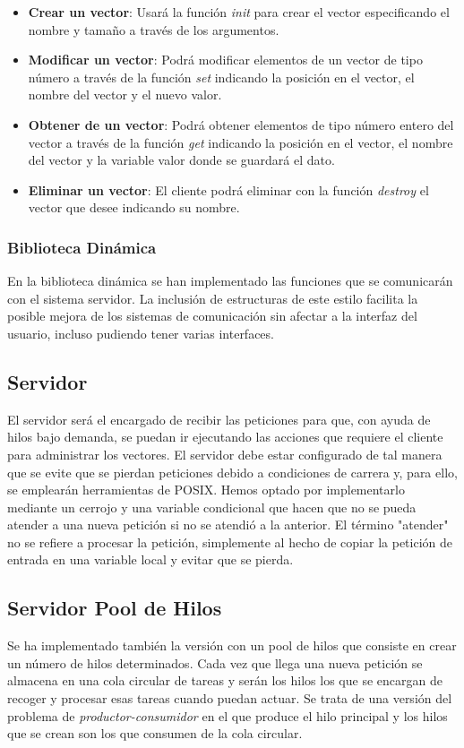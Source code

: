 \documentclass[10pt, spanish, pdftex]{template/UC3M_document}
\begin{document}
\begin{itemize}
  \item \textbf{Crear un vector}: Usará la función \textit{init} para crear el vector especificando el nombre y tamaño a través de los argumentos.
  \item \textbf{Modificar un vector}: Podrá modificar elementos de un vector de tipo número a través de la función \textit{set} indicando la posición en el vector, el nombre del vector y el nuevo valor.
  \item \textbf{Obtener de un vector}: Podrá obtener elementos de tipo número entero del vector a través de la función \textit{get} indicando la posición en el vector, el nombre del vector y la variable valor donde se guardará el dato.
  \item \textbf{Eliminar un vector}: El cliente podrá eliminar con la función \textit{destroy} el vector que desee indicando su nombre.
\end{itemize}

\subsubsection{Biblioteca Dinámica}
En la biblioteca dinámica se han implementado las funciones que se comunicarán con el sistema servidor. La inclusión de estructuras de este estilo facilita la posible mejora de los sistemas de comunicación sin afectar a la interfaz del usuario, incluso pudiendo tener varias interfaces.

\subsection{Servidor}
El servidor será el encargado de recibir las peticiones para que, con ayuda de hilos bajo demanda, se puedan ir ejecutando las acciones que requiere el cliente para administrar los vectores.
El servidor debe estar configurado de tal manera que se evite que se pierdan peticiones debido a condiciones de carrera y, para ello, se emplearán herramientas de POSIX. Hemos optado por implementarlo mediante un cerrojo y una variable condicional que hacen que no se pueda atender a una nueva petición si no se atendió a la anterior. El término "atender" no se refiere a procesar la petición, simplemente al hecho de copiar la petición de entrada en una variable local y evitar que se pierda.

\subsection{Servidor Pool de Hilos}
Se ha implementado también la versión con un pool de hilos que consiste en crear un número de hilos determinados. Cada vez que llega una nueva petición se almacena en una cola circular de tareas y serán los hilos los que se encargan de recoger y procesar esas tareas cuando puedan actuar. Se trata de una versión del problema de \textit{productor-consumidor} en el que produce el hilo principal y los hilos que se crean son los que consumen de la cola circular.
\end{document}
